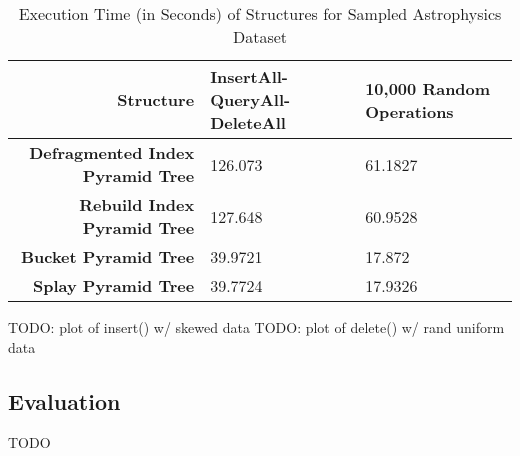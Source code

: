 \begin{landscape}
	\begin{table}
		\centering
		\begin{tabular}{|r|l|l|}
			\hline
			\textbf{Structure} & \textbf{InsertAll-QueryAll-DeleteAll} & \textbf{10,000 Random Operations} \\
			\hline
			\textbf{Defragmented Index Pyramid Tree} & 126.073 & 61.1827 \\
			\textbf{Rebuild Index Pyramid Tree} & 127.648 & 60.9528 \\
			\textbf{Bucket Pyramid Tree} & 39.9721 & 17.872 \\
			\textbf{Splay Pyramid Tree} & 39.7724 & 17.9326 \\
			\hline
		\end{tabular}
		\caption{Execution Time (in Seconds) of Structures for Sampled Astrophysics Dataset}
		\label{tab:perf2-astrophysics}
	\end{table}

\end{landscape}

TODO: plot of insert() w/ skewed data
TODO: plot of delete() w/ rand uniform data

\subsection{Evaluation}

TODO
